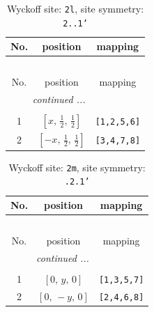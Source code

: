 \documentclass[fleqn,8pt]{jsarticle}
\begin{document}
\renewcommand{\arraystretch}{1.2}
\begin{longtable}{ccc}
\caption{Wyckoff site: {\tt 2l}, site symmetry: {\tt 2..1'}}
 \\
 \hline \hline
No. & position & mapping \\ \hline \endfirsthead

\multicolumn{2}{l}{\tablename\ \thetable{}} \\
 \hline \hline
No. & position & mapping \\ \hline \endhead

 \hline \hline
\multicolumn{2}{r}{\footnotesize\it continued ...} \\ \endfoot

 \hline \hline
\multicolumn{2}{r}{} \\ \endlastfoot

1 & $\left[ x,\, \frac{1}{2},\, \frac{1}{2} \right]$ & {\tt [1,2,5,6]} \\ \hline
2 & $\left[ - x,\, \frac{1}{2},\, \frac{1}{2} \right]$ & {\tt [3,4,7,8]} \\
\end{longtable}
\renewcommand{\arraystretch}{1.2}
\begin{longtable}{ccc}
\caption{Wyckoff site: {\tt 2m}, site symmetry: {\tt .2.1'}}
 \\
 \hline \hline
No. & position & mapping \\ \hline \endfirsthead

\multicolumn{2}{l}{\tablename\ \thetable{}} \\
 \hline \hline
No. & position & mapping \\ \hline \endhead

 \hline \hline
\multicolumn{2}{r}{\footnotesize\it continued ...} \\ \endfoot

 \hline \hline
\multicolumn{2}{r}{} \\ \endlastfoot

1 & $\left[ 0,\, y,\, 0 \right]$ & {\tt [1,3,5,7]} \\ \hline
2 & $\left[ 0,\, - y,\, 0 \right]$ & {\tt [2,4,6,8]} \\
\end{longtable}
\renewcommand{\arraystretch}{1.2}
\end{document}
